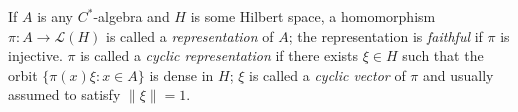 If $A$ is any $C^*$-algebra and $H$ is some Hilbert space, a homomorphism $\pi : A \to \mathcal{L}(H)$ is called a \textit{representation} of $A$; the representation is \textit{faithful} if $\pi$ is injective. $\pi$ is called a \textit{cyclic representation} if there exists $\xi \in H$ such that the orbit $\{\pi(x)\xi : x \in A\}$ is dense in $H$; $\xi$ is called a \textit{cyclic vector} of $\pi$ and usually assumed to satisfy $\|\xi\| = 1$.
